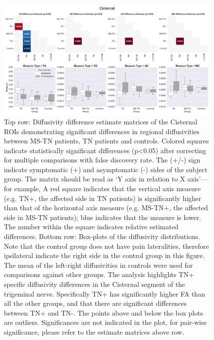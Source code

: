 \begin{figure}[p]
\includegraphics[width=\textwidth]{figure4.png}
\caption[Diffusivity difference estimate matrices of the Cisternal ROIs demonstrating significant differences in regional diffusivities between MS-TN patients, TN patients and controls.]{Top row: Diffusivity difference estimate matrices of the Cisternal ROIs demonstrating significant differences in regional diffusivities between MS-TN patients, TN patients and controls. Colored squares indicate statistically significant differences (p\textless 0.05) after correcting for multiple comparisons with false discovery rate. The (+/-) sign indicate symptomatic (+) and asymptomatic (-) sides of the subject group. The matrix should be read as ‘Y axis in relation to X axis’—for example, A red square indicates that the vertical axis measure (e.g. TN+, the affected side in TN patients) is significantly higher than that of the horizontal axis measure (e.g. MS-TN+, the affected side in MS-TN patients); blue indicates that the measure is lower. The number within the square indicates relative estimated differences. Bottom row: Box-plots of the diffusivity distributions. Note that the control group does not have pain lateralities, therefore ipsilateral indicate the right side in the control group in this figure. The mean of the left-right diffusivities in controls were used for comparisons against other groups. The analysis highlights TN+ specific diffusivity differences in the Cisternal segment of the trigeminal nerve. Specifically TN+ has significantly higher FA than all the other groups, and that there are significant differences between TN+ and TN-. The points above and below the box plots are outliers. Significances are not indicated in the plot, for pair-wise significance, please refer to the estimate matrices above row.}
\centering
\label{fig:MSfigure4}
\end{figure}

